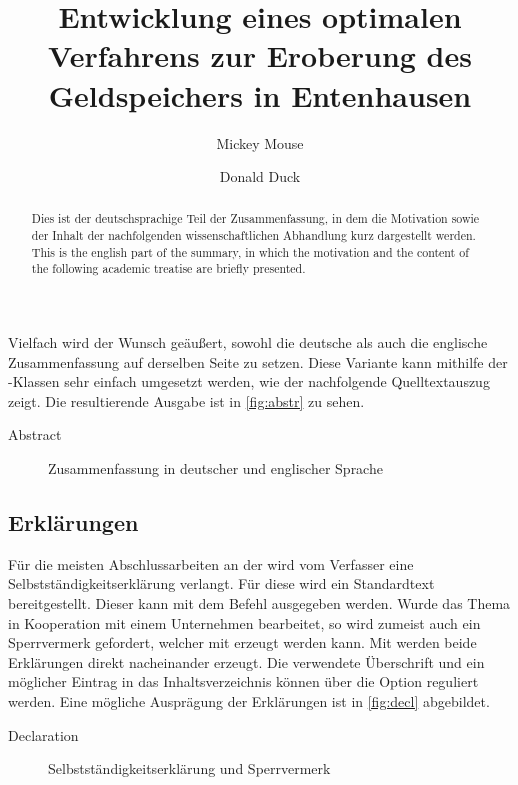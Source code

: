 \documentclass[%
  english,ngerman,%
  geometry=no,DIV=12,automark,%
]{tudscrartcl}
\begin{document}
Vielfach wird der Wunsch geäußert, sowohl die deutsche als auch die englische 
Zusammenfassung auf derselben Seite zu setzen. Diese Variante kann mithilfe 
der \TUDScript-Klassen sehr einfach umgesetzt werden, wie der nachfolgende 
Quelltextauszug zeigt. Die resultierende Ausgabe ist in \autoref{fig:abstr} zu 
sehen.
%
\begin{Excerpt!}{Abstract}
\begin{abstract}
  Dies ist der deutschsprachige Teil der Zusammenfassung, in dem die
  Motivation sowie der Inhalt der nachfolgenden wissenschaftlichen
  Abhandlung kurz dargestellt werden.
\nextabstract[english]
  This is the english part of the summary, in which the motivation and
  the content of the following academic treatise are briefly presented.
\end{abstract}
\end{Excerpt!}
%
\begin{figure}
\centering
{}
\caption{Zusammenfassung in deutscher und englischer Sprache}
\label{fig:abstr}
\end{figure}


\subsection{Erklärungen}
Für die meisten Abschlussarbeiten an der \TnUD wird vom Verfasser eine 
Selbstständigkeitserklärung verlangt. Für diese wird ein Standardtext 
bereitgestellt. Dieser kann mit dem Befehl  ausgegeben 
werden. Wurde das Thema in Kooperation mit einem Unternehmen bearbeitet, so 
wird zumeist auch ein Sperrvermerk gefordert, welcher mit  
erzeugt werden kann. Mit  werden beide Erklärungen direkt 
nacheinander erzeugt. Die verwendete Überschrift und ein möglicher Eintrag in 
das Inhaltsverzeichnis können über die Option  reguliert 
werden. Eine mögliche Ausprägung der Erklärungen ist in \autoref{fig:decl} 
abgebildet.
%
\begin{Excerpt!}{Declaration}
\title{%
  Entwicklung eines optimalen Verfahrens zur Eroberung des
  Geldspeichers in Entenhausen
}
\author{Mickey Mouse\and Donald Duck}
\declaration[company=FIRMA]
\end{Excerpt!}
%
\begin{figure}
\centering
{}
\caption{Selbstständigkeitserklärung und Sperrvermerk}
\label{fig:decl}
\end{figure}
\end{document}
